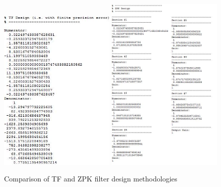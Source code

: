 \documentclass{article}
\begin{document}
\begin{figure}[H]
    \centering
    \includegraphics[width = 0.49\textwidth]{biquad_2}
    \includegraphics[width = 0.49\textwidth]{biquad_1}
    \caption{Comparison of TF and ZPK filter design methodologies}
    \label{fig:my_label}
\end{figure}
\end{document}
